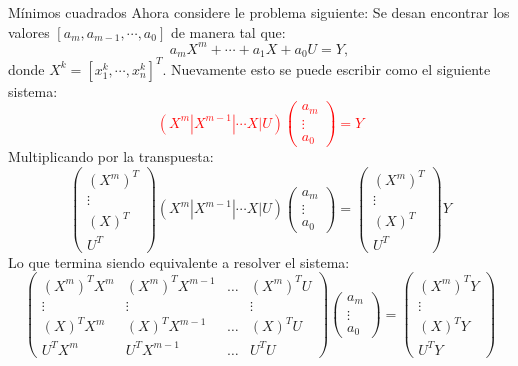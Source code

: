 \begin{frame}[allowframebreaks]{Mínimos cuadrados}
\indent Ahora considere le problema siguiente: Se desan encontrar los valores $[a_m,a_{m-1},\cdots,a_0]$ de manera tal que:
$$a_mX^m+\cdots+a_1X+a_0U=Y,$$
\indent donde $X^k=[x_1^k,\cdots,x_n^k]^T$. Nuevamente esto se puede escribir como el siguiente sistema:
\textcolor{red}{
\begin{displaymath}
(X^m|X^{m-1}|\cdots X|U)
\left(
\begin{array}{c}
a_m\\
\vdots\\
a_0
\end{array}
\right)=Y
\end{displaymath}
}
\indent Multiplicando por la transpuesta:
\begin{displaymath}
\left(
\begin{array}{c}
(X^m)^T\\
\vdots\\
(X)^T\\
U^T
\end{array}
\right)
(X^m|X^{m-1}|\cdots X|U)
\left(
\begin{array}{c}
a_m\\
\vdots\\
a_0
\end{array}
\right)=
\left(
\begin{array}{c}
(X^m)^T\\
\vdots\\
(X)^T\\
U^T
\end{array}
\right)
Y
\end{displaymath}
Lo que termina siendo equivalente a resolver el sistema:
\begin{displaymath}
\left(
\begin{array}{cccc}
(X^m)^TX^m & (X^m)^TX^{m-1} &\hdots & (X^m)^TU\\
\vdots&\vdots &&\vdots\\
(X)^TX^m&(X)^TX^{m-1}&\hdots &(X)^TU\\
U^TX^m&U^TX^{m-1}&\hdots &U^TU
\end{array}
\right)
\left(
\begin{array}{c}
a_m\\
\vdots\\
a_0
\end{array}
\right)=
\left(
\begin{array}{c}
(X^m)^TY\\
\vdots\\
(X)^TY\\
U^TY
\end{array}
\right)
\end{displaymath}
\end{frame}
